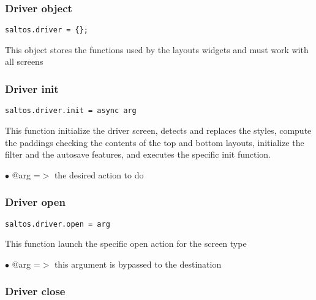 \documentclass[a4paper]{article}
\begin{document}
\hypertarget{toc724}{}
\subsubsection{Driver object}

\begin{lstlisting}
saltos.driver = {};
\end{lstlisting}

This object stores the functions used by the layouts widgets and must work with all screens

\hypertarget{toc725}{}
\subsubsection{Driver init}

\begin{lstlisting}
saltos.driver.init = async arg
\end{lstlisting}

This function initialize the driver screen, detects and replaces the styles, compute
the paddings checking the contents of the top and bottom layouts, initialize the filter
and the autosave features, and executes the specific init function.

\begin{compactitem}
\item[\color{myblue}$\bullet$] @arg =$>$ the desired action to do
\end{compactitem}

\hypertarget{toc726}{}
\subsubsection{Driver open}

\begin{lstlisting}
saltos.driver.open = arg
\end{lstlisting}

This function launch the specific open action for the screen type

\begin{compactitem}
\item[\color{myblue}$\bullet$] @arg =$>$ this argument is bypassed to the destination
\end{compactitem}

\hypertarget{toc727}{}
\subsubsection{Driver close}
\end{document}
